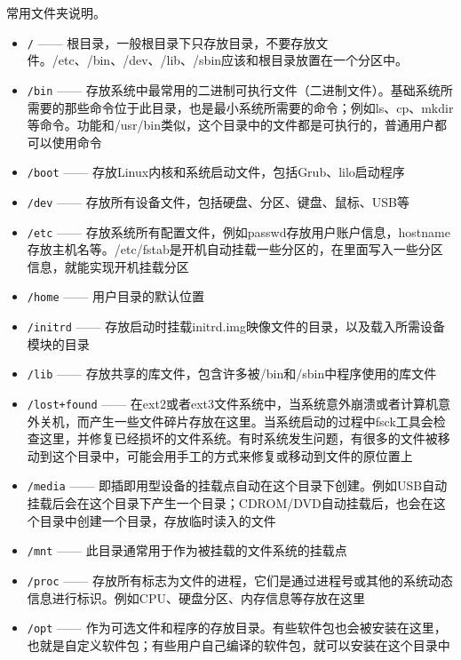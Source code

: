 \documentclass[doctor,openright,twoside]{sjtuthesis}
\providecommand{\tightlist}{%
    \setlength{\itemsep}{0pt}\setlength{\parskip}{0pt}}
\newcommand{\passthrough}[1]{#1}
\theoremstyle{plain}
\theoremstyle{definition}
\theoremstyle{remark}
\theoremstyle{ocrenumbox}
\theoremstyle{plain}
\begin{document}
常用文件夹说明。

\begin{itemize}
\tightlist
\item
  \passthrough{\lstinline!/!} ------
  根目录，一般根目录下只存放目录，不要存放文件。/etc、/bin、/dev、/lib、/sbin应该和根目录放置在一个分区中。
\item
  \passthrough{\lstinline!/bin!} ------
  存放系统中最常用的二进制可执行文件（二进制文件）。基础系统所需要的那些命令位于此目录，也是最小系统所需要的命令；例如ls、cp、mkdir等命令。功能和/usr/bin类似，这个目录中的文件都是可执行的，普通用户都可以使用命令
\item
  \passthrough{\lstinline!/boot!} ------
  存放Linux内核和系统启动文件，包括Grub、lilo启动程序
\item
  \passthrough{\lstinline!/dev!} ------
  存放所有设备文件，包括硬盘、分区、键盘、鼠标、USB等
\item
  \passthrough{\lstinline!/etc!} ------
  存放系统所有配置文件，例如passwd存放用户账户信息，hostname存放主机名等。/etc/fstab是开机自动挂载一些分区的，在里面写入一些分区信息，就能实现开机挂载分区
\item
  \passthrough{\lstinline!/home!} ------ 用户目录的默认位置
\item
  \passthrough{\lstinline!/initrd!} ------
  存放启动时挂载initrd.img映像文件的目录，以及载入所需设备模块的目录
\item
  \passthrough{\lstinline!/lib!} ------
  存放共享的库文件，包含许多被/bin和/sbin中程序使用的库文件
\item
  \passthrough{\lstinline!/lost+found!} ------
  在ext2或者ext3文件系统中，当系统意外崩溃或者计算机意外关机，而产生一些文件碎片存放在这里。当系统启动的过程中fsck工具会检查这里，并修复已经损坏的文件系统。有时系统发生问题，有很多的文件被移动到这个目录中，可能会用手工的方式来修复或移动到文件的原位置上
\item
  \passthrough{\lstinline!/media!} ------
  即插即用型设备的挂载点自动在这个目录下创建。例如USB自动挂载后会在这个目录下产生一个目录；CDROM/DVD自动挂载后，也会在这个目录中创建一个目录，存放临时读入的文件
\item
  \passthrough{\lstinline!/mnt!} ------
  此目录通常用于作为被挂载的文件系统的挂载点
\item
  \passthrough{\lstinline!/proc!} ------
  存放所有标志为文件的进程，它们是通过进程号或其他的系统动态信息进行标识。例如CPU、硬盘分区、内存信息等存放在这里
\item
  \passthrough{\lstinline!/opt!} ------
  作为可选文件和程序的存放目录。有些软件包也会被安装在这里，也就是自定义软件包；有些用户自己编译的软件包，就可以安装在这个目录中

\end{itemize}
\end{document}
